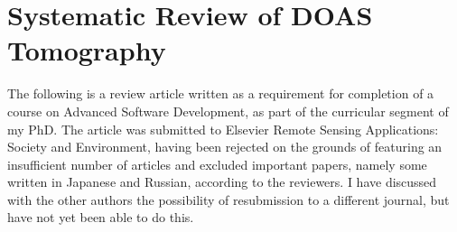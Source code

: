 \chapter{Systematic Review of DOAS Tomography}
\label{ap:tomDOAS}

The following is a review article written as a requirement for
completion of a course on Advanced Software Development, as part of the
curricular segment of my PhD. The article was submitted to Elsevier
Remote Sensing Applications: Society and Environment, having been
rejected on the grounds of featuring an insufficient number of articles
and excluded important papers, namely some written in Japanese and
Russian, according to the reviewers. I have discussed with the other
authors the possibility of resubmission to a different journal, but have
not yet been able to do this.



